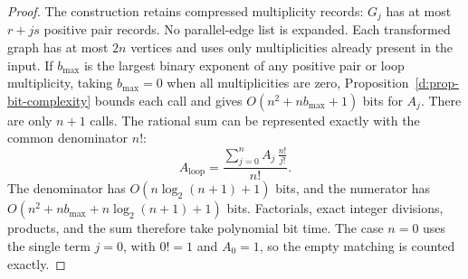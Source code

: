 \begin{proof}
The construction retains compressed multiplicity records:
\(G_j\) has at most \(r+js\) positive pair records. No parallel-edge
list is expanded. Each transformed graph has at most \(2n\) vertices and uses only
multiplicities already present in the input.  If \(b_{\max}\) is the largest
binary exponent of any positive pair or loop multiplicity, taking
\(b_{\max}=0\) when all multiplicities are zero,
Proposition~\ref{d:prop-bit-complexity} bounds each call and gives
\(O(n^2+nb_{\max}+1)\) bits for \(A_j\).
There are only \(n+1\) calls.
The rational sum can be represented exactly with the common denominator
\(n!\):
\begin{equation}
\label{c:eq-loop-common-denominator}
       A_{\mathrm{loop}}
          =\frac{\displaystyle\sum_{j=0}^n
                              A_j\,\frac{n!}{j!}}{n!}.
\end{equation}
The denominator has \(O(n\log_2(n+1)+1)\) bits, and the numerator has
\(O(n^2+nb_{\max}+n\log_2(n+1)+1)\) bits.
Factorials, exact integer divisions, products, and the sum therefore
take polynomial bit time.  The case \(n=0\) uses the single term
\(j=0\), with \(0!=1\) and \(A_0=1\), so the empty matching is counted
exactly.
\end{proof}
